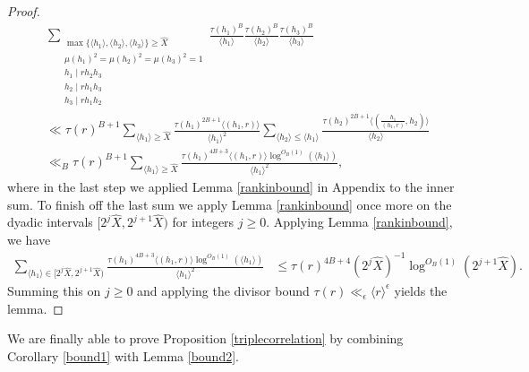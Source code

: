 \documentclass{article}
\theoremstyle{definition}
\theoremstyle{definition}
\theoremstyle{remark}
\newcommand{\1}{\mathbf{1}}
\numberwithin{equation}{section}
\begin{document}
\begin{proof}
\begin{align*}
&\sum_{\substack{\max\{\langle h_1\rangle, \langle h_2\rangle, \langle h_3\rangle\}\geq \widehat{X}\\ \mu(h_1)^2=\mu(h_2)^2=\mu(h_3)^2=1\\ h_1\mid rh_2h_3\\ h_2\mid rh_1h_3\\ h_3\mid rh_1h_2}}\frac{\tau(h_1)^B}{\langle h_1\rangle }\frac{\tau(h_2)^B}{\langle h_2\rangle }\frac{\tau(h_3)^B}{\langle h_3\rangle }\\
&\ll \tau(r)^{B+1} \sum_{\langle h_1\rangle \geq \widehat{X}}\frac{\tau(h_1)^{2B+1}\langle (h_1,r)\rangle}{\langle h_1\rangle^2 }\sum_{\langle h_2\rangle \leq \langle h_1\rangle }\frac{\tau(h_2)^{2B+1}\langle(\frac{h_1}{(h_1,r)},h_2) \rangle}{\langle h_2\rangle }
\\
&\ll_B  \tau(r)^{B+1} \sum_{\langle h_1\rangle \geq \widehat{X}}\frac{\tau(h_1)^{4B+3}\langle (h_1,r)\rangle \log^{O_B(1)}(\langle h_1\rangle)}{\langle h_1\rangle^2 },
\end{align*}
where in the last step we applied Lemma \ref{rankinbound} in Appendix to the inner sum. To finish off the last sum we apply Lemma \ref{rankinbound} once more on the dyadic intervals $\big[2^j\widehat{X},2^{j+1}\widehat{X}\big)$ for integers $j\ge0$. Applying Lemma \ref{rankinbound}, we have 
\begin{align*}
\sum_{\langle h_1\rangle\in[2^j\widehat{X},2^{j+1}\widehat{X})}\frac{\tau(h_1)^{4B+3}\langle (h_1,r)\rangle \log^{O_B(1)}(\langle h_1\rangle )}{\langle h_1\rangle^2 }&\leq \tau(r)^{4B+4}(2^j\widehat{X})^{-1}\log^{O_B(1)}(2^{j+1}\widehat{X}).
\end{align*}
Summing this on $j\ge0$ and applying the divisor bound $\tau(r)\ll_{\epsilon}\langle r\rangle^{\epsilon}$ yields the lemma. 
\end{proof}


We are finally able to prove Proposition \ref{triplecorrelation} by combining Corollary \ref{bound1} with Lemma \ref{bound2}.  
\end{document}
